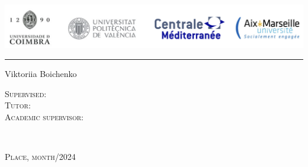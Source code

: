 \documentclass[11pt]{article}
\begin{document}
\thispagestyle{empty}
\begin{minipage}{0.96\linewidth}
\includegraphics[width=1\linewidth]{figures/universities.png}
\end{minipage}
\vspace{20pt}
\hrule
\vspace{5pt}

\begin{center}
\vfill
{
\LARGE{}

\vspace{0.5cm}
\Large
{}}   


\vfill
 
\Large{Viktoriia Boichenko}
 
\vfill

\LARGE{}

\LARGE{}

\Large
{}

\end{center}

\vfill

\begin{minipage}[t]{0.5\linewidth}
    \textsc{Supervised:} \medskip\\
    \textsc{Tutor:} \medskip\\
    \textsc{Academic supervisor:} \medskip\\
\end{minipage}
\begin{minipage}[t]{0.5\linewidth}
\end{minipage}

\vfill

\begin{minipage}[t]{0.5\linewidth}
    \textsc{} \medskip\\
\end{minipage}
\begin{minipage}[t]{0.5\linewidth}
    \large\textsc{Place, month/2024}\medskip\\
\end{minipage}

%     


\newpage
\end{document}
